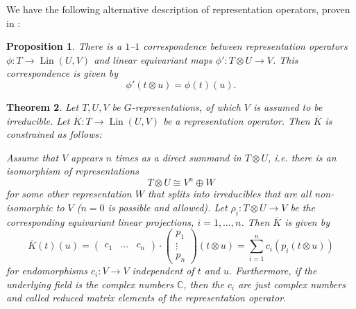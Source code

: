 \documentclass[12pt, a4paper]{article}
\theoremstyle{plain}
\newtheorem{pro}{Proposition}[section]
\newtheorem{thm}[pro]{Theorem}
\theoremstyle{definition}
\theoremstyle{remark}
\newcommand{\C}{\mathds{C}}
\DeclareMathOperator{\lin}{Lin}
\begin{document}
We have the following alternative description of representation operators, proven in \cite{wigner-eckart}:

\begin{pro}\label{correspondence}
There is a $1$–$1$ correspondence between representation operators $\phi: T \to \lin(U,V)$ and linear equivariant maps $\phi': T \otimes U \to V$. This correspondence is given by
\begin{equation*}
\phi'(t \otimes u) = \phi(t)(u).
\end{equation*}
\end{pro}

\begin{thm}\label{theorem}
Let $T, U, V$ be $G$-representations, of which $V$ is assumed to be irreducible. Let $\overline{K}: T \to \lin(U, V)$ be a representation operator. Then $\overline{K}$ is constrained as follows:

Assume that $V$ appears $n$ times as a direct summand in $T \otimes U$, i.e. there is an isomorphism of representations
\begin{equation*}
T \otimes U \cong V^n \oplus W
\end{equation*}
for some other representation $W$ that splits into irreducibles that are all non-isomorphic to $V$ ($n = 0$ is possible and allowed). Let $\rho_i: T \otimes U \to V$ be the corresponding equivariant linear projections, $i = 1, \dots, n$. Then $\overline{K}$ is given by
\begin{equation*}
\overline{K}(t)(u) = \begin{pmatrix}c_1 & \hdots & c_n \end{pmatrix} \cdot \begin{pmatrix} p_1 \\ \vdots \\ p_n \end{pmatrix} (t \otimes u)= \sum_{i = 1}^{n}c_i \left( p_i(t \otimes u) \right)
\end{equation*}
for endomorphisms $c_i: V \to V$ independent of $t$ and $u$. Furthermore, if the underlying field is the complex numbers $\C$, then the $c_i$ are just complex numbers and called reduced matrix elements of the representation operator. 
\end{thm}
\end{document}
